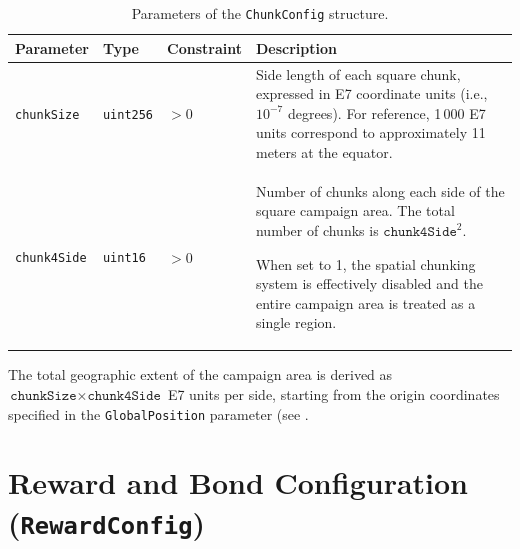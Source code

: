 \begin{table}
    \centering
    \caption{Parameters of the \texttt{ChunkConfig} structure.}
    \label{tab:params-chunks}
    \small
    \begin{tabular}{p{3.8cm} l p{2.8cm} p{4.8cm}}
        \hline
        \textbf{Parameter} & \textbf{Type} & \textbf{Constraint} & \textbf{Description} \\
        \hline
        \texttt{chunkSize}
        & \texttt{uint256}
        & $> 0$
        & Side length of each square chunk, expressed in E7 coordinate units (i.e., $10^{-7}$ degrees).
        For reference, 1\,000 E7 units correspond to approximately 11 meters at the equator. \\[6pt]

        \texttt{chunk4Side}
        & \texttt{uint16}
        & $> 0$
        & Number of chunks along each side of the square campaign area.
        The total number of chunks is $\texttt{chunk4Side}^2$.

        When set to 1, the spatial chunking system is effectively disabled and the entire campaign area is treated as a single region. \\
        \hline
    \end{tabular}
\end{table}

The total geographic extent of the campaign area is derived as $\texttt{chunkSize} \times \texttt{chunk4Side}$ E7 units per side, starting from the origin coordinates specified in the \texttt{GlobalPosition} parameter (see .
\section{Reward and Bond Configuration (\texttt{RewardConfig})}\label{sec:appendix-a-rewards}


